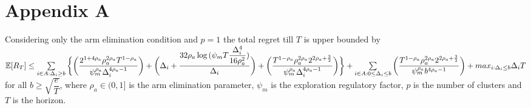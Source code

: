



\section{Appendix A}
\label{App:A}
\begin{proposition}
Considering only the arm elimination condition and $p=1$ the total regret till $T$ is upper bounded by $\mathbb{E} [R_{T}]\leq \sum\limits_{i\in A:\Delta_{i}\geq b}\bigg\lbrace\bigg(\dfrac{2^{1+4\rho_{a}}\rho_{a}^{2\rho_{a}}T^{1-\rho_{a}}}{\psi_{m}^{\rho_{a}}\Delta_{i}^{4\rho_{a}-1}}\bigg) + \bigg(\Delta_{i}+\dfrac{32\rho_{a}\log{(\psi_{m}T\dfrac{\Delta_{i}^{4}}{16\rho_{a}^{2}})}}{\Delta_{i}}\bigg)  +  \bigg(\dfrac{T^{1-\rho_{a}}\rho_{a}^{2\rho_{a}}2^{2\rho_{a}+\frac{3}{2}}}{\psi_{m}^{\rho_{a}}\Delta_{i}^{4\rho_{a} -1}} \bigg) \bigg \rbrace+\sum\limits_{i\in A:0\leq\Delta_{i}\leq b}\bigg(\dfrac{T^{1-\rho_{a}}\rho_{a}^{2\rho_{a}}2^{2\rho_{a}+\frac{3}{2}}}{\psi_{m}^{\rho_{a}}b^{4\rho_{a} -1}} \bigg) + max_{i:\Delta_{i}\leq b}\Delta_{i}T$ for all $b\geq\sqrt{\dfrac{e}{T}}$, where $\rho_{a}\in (0,1]$ is the arm elimination parameter, $\psi_{m}$ is the exploration regulatory factor, $p$ is the number of clusters and $T$ is the horizon.
\end{proposition}

